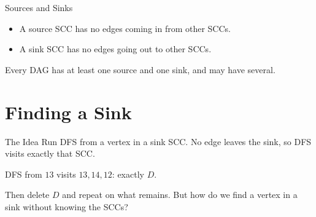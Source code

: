 \documentclass[10pt,aspectratio=169]{beamer}
\newcommand{\sccgraph}[2]{%
  \foreach \i/\x/\y/\g in {1/0/1.3/A, 2/1.2/0.8/A, 3/1.2/-0.8/A, 4/0/-1.3/A,
      5/-1.2/0/A, 6/3.0/1.0/B, 7/5.0/1.5/B, 8/5.0/-1.5/B, 9/3.0/-1.0/B,
      10/7.6/0.7/C, 11/7.6/-0.7/C, 12/10.2/0/D, 13/11.0/0.9/D, 14/11.0/-0.9/D}
    \node[vtx, g\g, v\i/.try] (v\i) at (\x,\y) {\i};
  \foreach \a/\b/\o/\t in {1/2/0/1, 2/3/0/1, 3/4/0/1, 4/2/0/0, 4/5/0/1,
      5/1/0/0, 6/7/0/1, 7/8/0/1, 8/6/0/0, 8/9/0/1, 9/6/0/0, 10/11/25/1,
      11/10/25/0, 12/13/25/0, 13/14/25/1, 14/12/25/1, 5/6/-20/1, 9/10/0/1,
      11/13/-20/1, 2/9/0/0, 7/12/30/0} {
    \ifnum#2=1 \ifnum\t=1 \def\es{tree}\else\def\es{}\fi \else\def\es{}\fi
    \ifnum#1=0
      \draw[dedg, \es] (v\a) to[bend left=\o] (v\b);
    \else
      \draw[dedg] (v\b) to[bend right=\o] (v\a);
    \fi
  }
}
\newcommand{\sccboxes}{%
  \draw[sccbox] (-1.75,-1.85) rectangle (1.75,1.85);
  \draw[sccbox] (2.45,-2.05) rectangle (5.55,2.05);
  \draw[sccbox] (7.0,-1.3) rectangle (8.2,1.3);
  \draw[sccbox] (9.6,-1.5) rectangle (11.6,1.5);
  \node[scclbl] at (0,2.15) {$A$};
  \node[scclbl] at (4.0,2.35) {$B$};
  \node[scclbl] at (7.6,-1.6) {$C$};
  \node[scclbl] at (10.6,1.8) {$D$};
}
\begin{document}
\begin{frame}{Sources and Sinks}
  \begin{itemize}
    \item A \alert{source} SCC has no edges coming in from other SCCs.
    \item A \alert{sink} SCC has no edges going out to other SCCs.
  \end{itemize}

  \bigskip
  \begin{center}
  \end{center}

  \bigskip
  \begin{center}
    Every DAG has at least one source and one sink, and may have several.
  \end{center}
\end{frame}

\section{Finding a Sink}

\begin{frame}{The Idea}
  Run DFS from a vertex in a \alert{sink} SCC. No edge leaves the sink, so
  DFS visits \alert{exactly} that SCC.

  \begin{center}
  \end{center}

  \begin{center}
    \small DFS from $13$ visits $13, 14, 12$: exactly $D$.
  \end{center}

  \pause
  \begin{center}
    Then delete $D$ and repeat on what remains.
    \alert{But how do we find a vertex in a sink without knowing the SCCs?}
  \end{center}
\end{frame}
\end{document}
